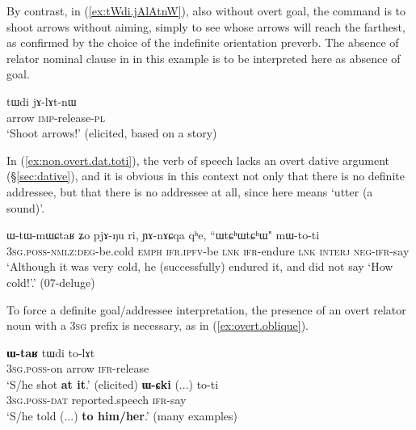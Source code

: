 By contrast, in (\ref{ex:tWdi.jAlAtnW}), also without overt goal, the command is to shoot arrows without aiming, simply to see whose arrows will reach the farthest, as confirmed by the choice of the indefinite orientation preverb. The absence of relator nominal clause in  in this example is to be interpreted here as absence of goal.

\begin{exe}
\ex \label{ex:tWdi.jAlAtnW}
\gll  tɯdi jɤ-lɤt-nɯ \\
arrow \textsc{imp}-release-\textsc{pl} \\
\glt `Shoot arrows!' (elicited, based on a story)
\end{exe}

In (\ref{ex:non.overt.dat.toti}), the verb of speech  lacks an overt dative argument (§\ref{sec:dative}), and it is obvious in this context not only that there is no definite addressee, but that there is no addressee at all, since  here means `utter (a sound)'. 

\begin{exe}
\ex \label{ex:non.overt.dat.toti}
\gll ɯ-tɯ-mɯɕtaʁ ʑo pjɤ-ŋu ri, ɲɤ-nɤɕqa qʰe, ``ɯtɕʰɯtɕʰɯ" mɯ-to-ti \\
\textsc{3sg}.\textsc{poss}-\textsc{nmlz}:\textsc{deg}-be.cold \textsc{emph} \textsc{ifr}.\textsc{ipfv}-be \textsc{lnk} \textsc{ifr}-endure \textsc{lnk} \textsc{interj} \textsc{neg}-\textsc{ifr}-say \\
\glt `Although it was very cold, he (successfully) endured it, and did not say `How cold!'.' (07-deluge)
\end{exe}

To force a definite goal/addressee interpretation, the presence of an overt relator noun with a \textsc{3sg} prefix is necessary, as in (\ref{ex:overt.oblique}).

\begin{exe}
\ex \label{ex:overt.oblique}
\begin{xlist}
\ex \label{ex:WtaR.tWdi.tolAt}
\gll \textbf{ɯ-taʁ} tɯdi to-lɤt \\
\textsc{3sg}.\textsc{poss}-on arrow \textsc{ifr}-release \\
\glt `S/he shot \textbf{at it}.' (elicited)
\ex  \label{ex:WCki.toti2}
\gll \textbf{ɯ-ɕki} (...) to-ti \\
\textsc{3sg}.\textsc{poss}-\textsc{dat} reported.speech \textsc{ifr}-say \\
\textsc{\glt} `S/he told (...) \textbf{to him/her}.' (many examples)
\end{xlist}
\end{exe}

